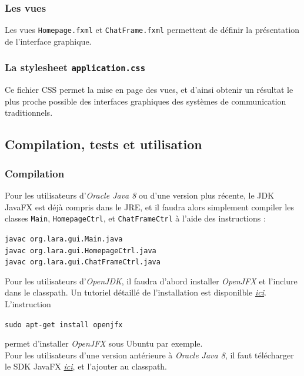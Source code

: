 \documentclass[10pt,a4paper]{article}
\begin{document}
\subsubsection{Les vues}

Les vues \texttt{Homepage.fxml} et \texttt{ChatFrame.fxml} permettent de définir la présentation de l'interface graphique.

\subsubsection{La stylesheet \texttt{application.css}}

Ce fichier CSS permet la mise en page des vues, et d'ainsi obtenir un résultat le plus proche possible des interfaces graphiques des systèmes de communication traditionnels. 

\subsection{Compilation, tests et utilisation}

\subsubsection{Compilation}
Pour les utilisateurs d'\textit{Oracle Java 8} ou d'une version plus récente, le JDK JavaFX est déjà compris dans le JRE, et il faudra alors simplement compiler les classes \texttt{Main}, \texttt{HomepageCtrl}, et \texttt{ChatFrameCtrl} à l'aide des instructions : 

\begin{center}
    \texttt{javac org.lara.gui.Main.java} \\
    \texttt{javac org.lara.gui.HomepageCtrl.java}\\
    \texttt{javac org.lara.gui.ChatFrameCtrl.java}
\end{center}

Pour les utilisateurs d'\textit{OpenJDK}, il faudra d'abord installer \textit{OpenJFX} et l'inclure dans le classpath. Un tutoriel détaillé de l'installation est disponilble \href{https://wiki.openjdk.java.net/display/OpenJFX/Building+OpenJFX}{\textit{ici}}. L'instruction 

\begin{center}
    \texttt{sudo apt-get install openjfx}
\end{center}
permet d'installer \textit{OpenJFX} sous Ubuntu par exemple. \\

Pour les utilisateurs d'une version antérieure à \textit{Oracle Java 8}, il faut télécharger le SDK JavaFX \href{https://gluonhq.com/products/javafx/}{\textit{ici}}, et l'ajouter au classpath. \\
\end{document}
